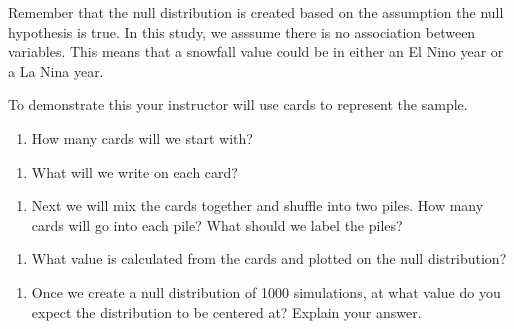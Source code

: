 \documentclass[
]{report}
\providecommand{\tightlist}{%
  \setlength{\itemsep}{0pt}\setlength{\parskip}{0pt}}
\begin{document}
Remember that the null distribution is created based on the assumption the null hypothesis is true. In this study, we asssume there is no association between variables. This means that a snowfall value could be in either an El Nino year or a La Nina year.

To demonstrate this your instructor will use cards to represent the sample.

\begin{enumerate}
\def\labelenumi{\arabic{enumi}.}
\setcounter{enumi}{9}
\tightlist
\item
  How many cards will we start with?
\end{enumerate}

\vspace{0.5in}

\begin{enumerate}
\def\labelenumi{\arabic{enumi}.}
\setcounter{enumi}{10}
\tightlist
\item
  What will we write on each card?
\end{enumerate}

\vspace{0.5in}

\begin{enumerate}
\def\labelenumi{\arabic{enumi}.}
\setcounter{enumi}{11}
\tightlist
\item
  Next we will mix the cards together and shuffle into two piles. How many cards will go into each pile? What should we label the piles?
\end{enumerate}

\vspace{1in}

\begin{enumerate}
\def\labelenumi{\arabic{enumi}.}
\setcounter{enumi}{12}
\tightlist
\item
  What value is calculated from the cards and plotted on the null distribution?
\end{enumerate}

\vspace{1in}

\begin{enumerate}
\def\labelenumi{\arabic{enumi}.}
\setcounter{enumi}{13}
\tightlist
\item
  Once we create a null distribution of 1000 simulations, at what value do you expect the distribution to be centered at? Explain your answer.
\end{enumerate}

\vspace{1in}
\end{document}
